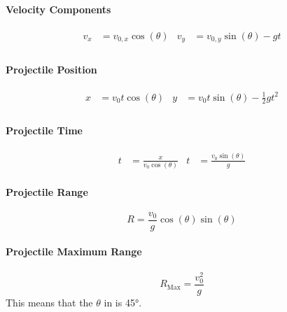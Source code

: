\paragraph{Velocity Components}\label{par:Projectile Velocity Components}
\begin{equation}\label{eq:Projectile Velocity Components}
  \begin{aligned}
    v_{x} &= v_{0,x} \cos ( \theta ) & v_{y} &= v_{0,y} \sin ( \theta ) -gt \\
  \end{aligned}
\end{equation}

\paragraph{Projectile Position}\label{par:Projectile Position}
\begin{equation}\label{eq:Projectile Position}
  \begin{aligned}
    x &= v_{0} t \cos ( \theta ) & y &= v_{0} t \sin ( \theta ) - \frac{1}{2} gt^{2} \\
  \end{aligned}
\end{equation}

\paragraph{Projectile Time}\label{par:Projectile Time}
\begin{equation}\label{eq:Projectile Time}
  \begin{aligned}
    t &= \frac{x}{v_{0} \cos ( \theta )} & t &= \frac{v_{0} \sin ( \theta )}{g}
  \end{aligned}
\end{equation}

\paragraph{Projectile Range}\label{par:Projectile Range}
\begin{equation}\label{eq:Projectile Range}
  R = \frac{v_{0}}{g} \cos ( \theta ) \sin ( \theta )
\end{equation}

\paragraph{Projectile Maximum Range}\label{par:Projectile Maximum Range}
\begin{equation}\label{eq:Projectile Maximum Range}
  R_{\text{Max}} = \frac{v_{0}^{2}}{g}
\end{equation}
This means that the $\theta$ in  is \ang{45}.


